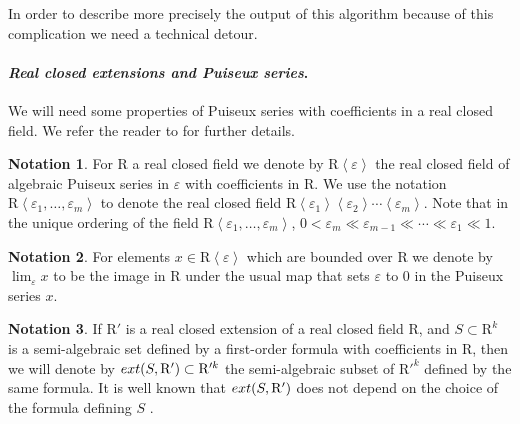 \documentclass{amsart}[10pts]
\theoremstyle{definition}
\newtheorem{notation}{Notation}[section]
\theoremstyle{remark}
\theoremstyle{observation}
\numberwithin{equation}{section}
\newcommand {\R} {\mathrm{R}}
\newcommand {\eps} {{\varepsilon}}
\newcommand {\E} {{\rm ext}}
\begin{document}
\medskip
In order to describe more precisely the output of this algorithm because of this 
complication we need a technical detour. 

\medskip
\paragraph{\emph{Real closed extensions and Puiseux series}.}
We will need some
properties of Puiseux series with coefficients in a real closed field. We
refer the reader to \cite{BPRbook2} for further details.

\begin{notation}
  For $\R$ a real closed field we denote by $\R \left\langle \eps
  \right\rangle$ the real closed field of algebraic Puiseux series in $\eps$
  with coefficients in $\R$. We use the notation $\R \left\langle \eps_{1},
  \ldots, \eps_{m} \right\rangle$ to denote the real closed field $\R
  \left\langle \eps_{1} \right\rangle \left\langle \eps_{2} \right\rangle
  \cdots \left\langle \eps_{m} \right\rangle$. Note that in the unique
  ordering of the field $\R \left\langle \eps_{1}, \ldots, \eps_{m}
  \right\rangle$, $0< \eps_{m} \ll \eps_{m-1} \ll \cdots \ll \eps_{1} \ll 1$.
\end{notation}

\begin{notation}
\label{not:lim}
  For elements $x \in \R \left\langle \eps \right\rangle$ which are bounded
  over $\R$ we denote by $\lim_{\eps}  x$ to be the image in $\R$ under the
  usual map that sets $\eps$ to $0$ in the Puiseux series $x$.
\end{notation}

\begin{notation}
\label{not:extension}
  If $\R'$ is a real closed extension of a real closed field $\R$, and $S
  \subset \R^{k}$ is a semi-algebraic set defined by a first-order formula
  with coefficients in $\R$, then we will denote by $\E(S, \R') \subset \R'^{k}$ the semi-algebraic subset of $\R'^{k}$ defined by
  the same formula.
 It is well known that $\E(S, \R')$ does
  not depend on the choice of the formula defining $S$ 
  \cite[Proposition 2.87]{BPRbook2}.
\end{notation}
\end{document}
